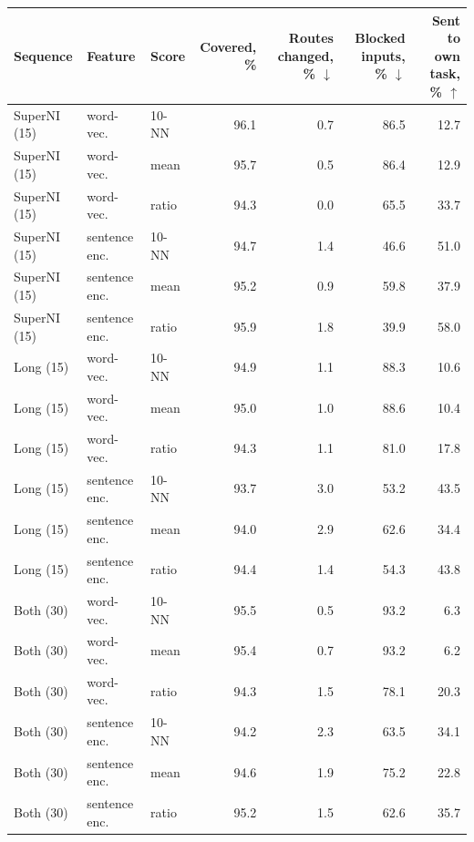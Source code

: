 \begin{tabular}{lllrrrr}
    \toprule
    Sequence & Feature & Score & Covered, \% & \shortstack[r]{Routes\\changed, \% $\downarrow$} & \shortstack[r]{Blocked inputs,\\\% $\downarrow$} & \shortstack[r]{Sent to own\\task, \% $\uparrow$} \\
    \midrule
    SuperNI (15) & word-vec. & 10-NN & 96.1 & 0.7 & 86.5 & 12.7 \\
    SuperNI (15) & word-vec. & mean & 95.7 & 0.5 & 86.4 & 12.9 \\
    SuperNI (15) & word-vec. & ratio & 94.3 & 0.0 & 65.5 & 33.7 \\
    SuperNI (15) & sentence enc. & 10-NN & 94.7 & 1.4 & 46.6 & 51.0 \\
    SuperNI (15) & sentence enc. & mean & 95.2 & 0.9 & 59.8 & 37.9 \\
    SuperNI (15) & sentence enc. & ratio & 95.9 & 1.8 & 39.9 & 58.0 \\
    \midrule
    Long (15) & word-vec. & 10-NN & 94.9 & 1.1 & 88.3 & 10.6 \\
    Long (15) & word-vec. & mean & 95.0 & 1.0 & 88.6 & 10.4 \\
    Long (15) & word-vec. & ratio & 94.3 & 1.1 & 81.0 & 17.8 \\
    Long (15) & sentence enc. & 10-NN & 93.7 & 3.0 & 53.2 & 43.5 \\
    Long (15) & sentence enc. & mean & 94.0 & 2.9 & 62.6 & 34.4 \\
    Long (15) & sentence enc. & ratio & 94.4 & 1.4 & 54.3 & 43.8 \\
    \midrule
    Both (30) & word-vec. & 10-NN & 95.5 & 0.5 & 93.2 & 6.3 \\
    Both (30) & word-vec. & mean & 95.4 & 0.7 & 93.2 & 6.2 \\
    Both (30) & word-vec. & ratio & 94.3 & 1.5 & 78.1 & 20.3 \\
    Both (30) & sentence enc. & 10-NN & 94.2 & 2.3 & 63.5 & 34.1 \\
    Both (30) & sentence enc. & mean & 94.6 & 1.9 & 75.2 & 22.8 \\
    Both (30) & sentence enc. & ratio & 95.2 & 1.5 & 62.6 & 35.7 \\
    \bottomrule
\end{tabular}
